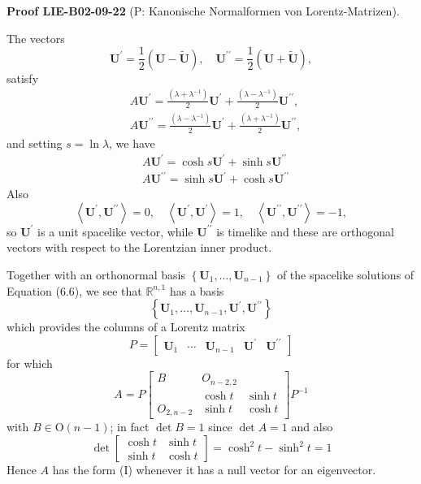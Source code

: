 \documentclass[10pt, letterpaper]{article}
\newcommand{\CustomHeading}[3]{%
  \par\medskip\noindent%
  \textbf{#1 #2} \textnormal{(#3)}.\enskip%
}
\newenvironment{PROOF}[2]{\begin{unitbox}\CustomHeading{Proof}{#1}{#2}}{\end{unitbox}}
\begin{document}
\begin{PROOF}{LIE-B02-09-22}{P: Kanonische Normalformen von Lorentz-Matrizen}
The vectors
$$
\mathbf{U}^{\prime}=\frac{1}{2}(\mathbf{U}-\tilde{\mathbf{U}}), \quad \mathbf{U}^{\prime \prime}=\frac{1}{2}(\mathbf{U}+\tilde{\mathbf{U}}),
$$
satisfy
$$
\begin{aligned}
& A \mathbf{U}^{\prime}=\frac{\left(\lambda+\lambda^{-1}\right)}{2} \mathbf{U}^{\prime}+\frac{\left(\lambda-\lambda^{-1}\right)}{2} \mathbf{U}^{\prime \prime}, \\
& A \mathbf{U}^{\prime \prime}=\frac{\left(\lambda-\lambda^{-1}\right)}{2} \mathbf{U}^{\prime}+\frac{\left(\lambda+\lambda^{-1}\right)}{2} \mathbf{U}^{\prime \prime},
\end{aligned}
$$
and setting $s=\ln \lambda$, we have
$$
\begin{aligned}
& A \mathbf{U}^{\prime}=\cosh s \mathbf{U}^{\prime}+\sinh s \mathbf{U}^{\prime \prime} \\
& A \mathbf{U}^{\prime \prime}=\sinh s \mathbf{U}^{\prime}+\cosh s \mathbf{U}^{\prime \prime}
\end{aligned}
$$
Also
$$
\left\langle\mathbf{U}^{\prime}, \mathbf{U}^{\prime \prime}\right\rangle=0, \quad\left\langle\mathbf{U}^{\prime}, \mathbf{U}^{\prime}\right\rangle=1, \quad\left\langle\mathbf{U}^{\prime \prime}, \mathbf{U}^{\prime \prime}\right\rangle=-1,
$$
so $\mathbf{U}^{\prime}$ is a unit spacelike vector, while $\mathbf{U}^{\prime \prime}$ is timelike and these are orthogonal vectors with respect to the Lorentzian inner product.

Together with an orthonormal basis $\left\{\mathbf{U}_{1}, \ldots, \mathbf{U}_{n-1}\right\}$ of the spacelike solutions of Equation (6.6), we see that $\mathbb{R}^{n, 1}$ has a basis
$$
\left\{\mathbf{U}_{1}, \ldots, \mathbf{U}_{n-1}, \mathbf{U}^{\prime}, \mathbf{U}^{\prime \prime}\right\}
$$
which provides the columns of a Lorentz matrix
$$
P=\left[\begin{array}{lllll}
\mathbf{U}_{1} & \cdots & \mathbf{U}_{n-1} & \mathbf{U}^{\prime} & \mathbf{U}^{\prime \prime}
\end{array}\right]
$$
for which
$$
A=P\left[\begin{array}{ccc}
B & O_{n-2,2} \\
& \cosh t & \sinh t \\
O_{2, n-2} & \sinh t & \cosh t
\end{array}\right] P^{-1}
$$
with $B \in \mathrm{O}(n-1)$; in fact $\operatorname{det} B=1$ since $\operatorname{det} A=1$ and also
$$
\operatorname{det}\left[\begin{array}{cc}
\cosh t & \sinh t \\
\sinh t & \cosh t
\end{array}\right]=\cosh ^{2} t-\sinh ^{2} t=1
$$
Hence $A$ has the form (I) whenever it has a null vector for an eigenvector.



\end{PROOF}
\end{document}
